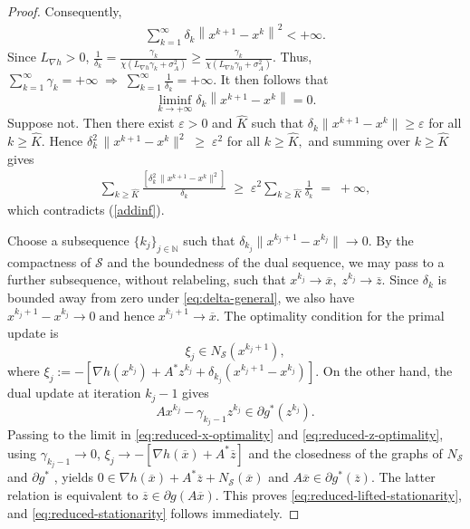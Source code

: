 \documentclass[11pt]{article}
\numberwithin{equation}{section}
\begin{document}
\begin{proof}
Consequently,
\begin{eqnarray}\label{addinf}\sum_{k=1}^{\infty}
    \delta_k\left\|x^{k+1}-x^k\right\|^2
    <+\infty.\end{eqnarray}
Since \(L_{\nabla h}>0\),
$\frac{1}{\delta_k} =
    \frac{\gamma_k}
    {\chi\left(L_{\nabla h}\gamma_k+\sigma_A^2\right)}
    \geq
    \frac{\gamma_k}
    {\chi\left(L_{\nabla h}\gamma_0+\sigma_A^2\right)}.$
    Thus,
$\sum_{k=1}^{\infty}\gamma_{k}=+\infty
    \;\Longrightarrow\;
    \sum_{k=1}^{\infty}\frac{1}{\delta_k}=+\infty.$
It then follows that
$$
    \liminf_{k\to+\infty}
    \delta_k\left\|x^{k+1}-x^k\right\|
    =0.
$$
Suppose not. Then there exist $\varepsilon>0$ and $\widehat K$ such that
$\delta_k\|x^{k+1}-x^k\|\ge\varepsilon$ for all $k\ge\widehat K$. Hence
$
  \delta_k^2\,\|x^{k+1}-x^k\|^2 \;\ge\; \varepsilon^2$
  for all $k\ge\widehat K,$
and summing over $k\ge\widehat K$ gives
\begin{eqnarray*}
  \sum_{k\ge\widehat K}\frac{[\delta_k^2\,\|x^{k+1}-x^k\|^2]}{\delta_k}
  \;\ge\; \varepsilon^2\sum_{k\ge\widehat K}\frac{1}{\delta_k} \;=\; +\infty,
\end{eqnarray*}
which contradicts (\ref{addinf}).

\noindent Choose a subsequence $\{k_j\}_{j\in\mathbb N}$ such that
$ \delta_{k_j}\|x^{k_j+1}-x^{k_j}\|\to0.$
By the compactness of $\mathcal S$ and the boundedness of the dual sequence,
we may pass to a further subsequence, without relabeling, such that
$x^{k_j}\to\overline x,\; z^{k_j}\to\overline z.$
Since $\delta_k$ is bounded away from zero under
\eqref{eq:delta-general}, we also have
$x^{k_j+1}-x^{k_j}\to0
    \;\text{and hence}\;
    x^{k_j+1}\to\overline x.$
The optimality condition for the primal update is
\begin{equation}\label{eq:reduced-x-optimality}
   \xi_j\in N_{\mathcal S}(x^{k_j+1}),
\end{equation}
where $\xi_j:=-[ \nabla h(x^{k_j})
    +A^*z^{k_j}
    +\delta_{k_j}(x^{k_j+1}-x^{k_j})]$.
On the other hand, the dual update at iteration $k_j-1$ gives
\begin{equation}\label{eq:reduced-z-optimality}
    Ax^{k_j}-\gamma_{k_j-1}z^{k_j}
    \in\partial g^*(z^{k_j}).
\end{equation}
Passing to the limit in \eqref{eq:reduced-x-optimality} and
\eqref{eq:reduced-z-optimality}, using $\gamma_{k_j-1}\to0$, $\xi_j\to -[\nabla h(\overline x)+A^*\overline z]$ and the closedness of
the graphs of $N_{\mathcal S}$ and $\partial g^*$ \cite[Proposition~8.7]{RockWets}, yields
$
    0\in
    \nabla h(\overline x)+A^*\overline z+N_{\mathcal S}(\overline x)
$
and
$
    A\overline x\in\partial g^*(\overline z).
$
The latter relation is equivalent to
$\overline z\in\partial g(A\overline x)$. This proves
\eqref{eq:reduced-lifted-stationarity}, and
\eqref{eq:reduced-stationarity} follows immediately.
\end{proof}
\end{document}
